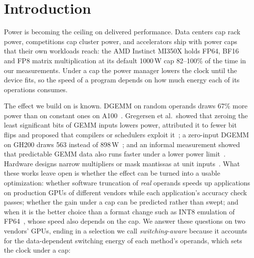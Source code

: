 \documentclass[conference]{IEEEtran}
\newcommand{\W}{\,W}
\newcommand{\pct}{\%}
\begin{document}
\section{Introduction}

Power is becoming the ceiling on delivered performance. Data centers cap rack power, competitions cap cluster power,
and accelerators ship with power caps that their own workloads reach: the AMD Instinct MI350X holds FP64, BF16 and
FP8 matrix multiplication at its default 1000\W{} cap 82--100\pct{} of the time in our measurements. Under a cap the
power manager lowers the clock until the device fits, so the speed of a program depends on how much energy each of its
operations consumes.

The effect we build on is known. DGEMM on random operands draws 67\pct{} more power than on constant ones on
A100~\cite{Bhalachandra2022}. Gregersen et al.\ showed that zeroing the least significant bits of GEMM inputs lowers
power, attributed it to fewer bit flips and proposed that compilers or schedulers exploit it~\cite{Gregersen2024}; a
zero-input DGEMM on GH200 draws 563 instead of 898\W~\cite{Antepara2025}; and an informal measurement showed that
predictable GEMM data also runs faster under a lower power limit~\cite{He2024}. Hardware designs narrow multipliers or
mask mantissas at unit inputs~\cite{Tong2000,Pool2011,Guenther2016,AMD2022}. What these works leave open is whether the
effect can be turned into a usable optimization: whether software truncation of \emph{real} operands speeds up
applications on production GPUs of different vendors while each application's accuracy check passes; whether the gain
under a cap can be predicted rather than swept; and when it is the better choice than a format change such as INT8
emulation of FP64~\cite{Ozaki2025,Uchino2025}, whose speed also depends on the cap. We answer these questions on
two vendors' GPUs, ending in a selection we call \emph{switching-aware} because it accounts for the data-dependent
switching energy of each method's operands, which sets the clock under a cap:
\end{document}
